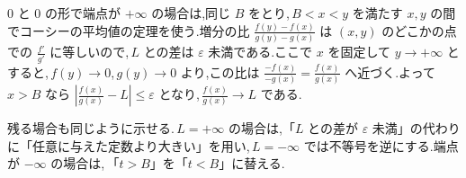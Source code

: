 $0$ と $0$ の形で端点が $+\infty$ の場合は,同じ $B$ をとり,\,$B<x<y$ を満たす $x,y$ の間でコーシーの平均値の定理を使う.増分の比 $\frac{f(y)-f(x)}{g(y)-g(x)}$ は $(x,y)$ のどこかの点での $\frac{f'}{g'}$ に等しいので,\,$L$ との差は $\varepsilon$ 未満である.ここで $x$ を固定して $y\to+\infty$ とすると,\,$f(y)\to0$,\,$g(y)\to0$ より,この比は $\frac{-f(x)}{-g(x)}=\frac{f(x)}{g(x)}$ へ近づく.よって $x>B$ なら $\left|\frac{f(x)}{g(x)}-L\right|\le\varepsilon$ となり,\,$\frac{f(x)}{g(x)}\to L$ である.

残る場合も同じように示せる.\,$L=+\infty$ の場合は,「$L$ との差が $\varepsilon$ 未満」の代わりに「任意に与えた定数より大きい」を用い,\,$L=-\infty$ では不等号を逆にする.端点が $-\infty$ の場合は,\,「$t>B$」を「$t<B$」に替える.
